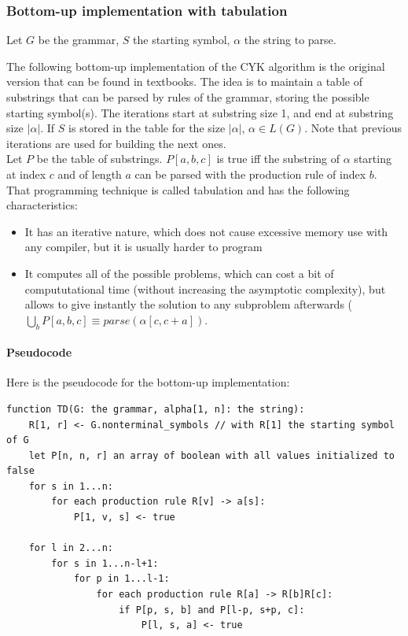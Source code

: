 \documentclass[]{article}
\begin{document}
\begin{multicols}{2}
\subsubsection{Bottom-up implementation with tabulation}
Let $G$ be the grammar, $S$ the starting symbol, $\alpha$ the string to parse.\par

The following bottom-up implementation of the CYK algorithm is the original version that can be found in textbooks. The idea is to maintain a table of substrings that can be parsed by rules of the grammar, storing the possible starting symbol(s). The iterations start at substring size 1, and end at substring size $|\alpha|$. If $S$ is stored in the table for the size $|\alpha|$, $\alpha\in L(G)$. Note that previous iterations are used for building the next ones.\\
Let $P$ be the table of substrings. $P[a,b,c]$ is true iff the substring of $\alpha$ starting at index $c$ and of length $a$ can be parsed with the production rule of index $b$.\\
That programming technique is called tabulation and has the following characteristics:
\begin{itemize}
\item It has an iterative nature, which does not cause excessive memory use with any compiler, but it is usually harder to program
  \item It computes all of the possible problems, which can cost a bit of compututational time (without increasing the asymptotic complexity), but allows to give instantly the solution to any subproblem afterwards ($\displaystyle\bigcup_bP[a,b,c]\equiv parse(\alpha[c, c+a])$.
\end{itemize}

\paragraph{Pseudocode} Here is the pseudocode for the bottom-up implementation:
\begin{lstlisting}
function TD(G: the grammar, alpha[1, n]: the string):
    R[1, r] <- G.nonterminal_symbols // with R[1] the starting symbol of G
    let P[n, n, r] an array of boolean with all values initialized to false
    for s in 1...n:
        for each production rule R[v] -> a[s]:
            P[1, v, s] <- true
    
    for l in 2...n:
        for s in 1...n-l+1:
            for p in 1...l-1:
                for each production rule R[a] -> R[b]R[c]:
                    if P[p, s, b] and P[l-p, s+p, c]: 
                        P[l, s, a] <- true


\end{lstlisting}
\end{multicols}
\end{document}
